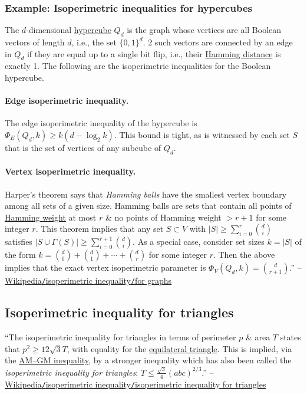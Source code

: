 \documentclass[oneside]{book}
\numberwithin{equation}{section}
\begin{document}
\subsubsection{Example: Isoperimetric inequalities for hypercubes}
The $d$-dimensional \href{https://en.wikipedia.org/wiki/Hypercube}{hypercube} $Q_d$ is the graph whose vertices are all Boolean vectors of length $d$, i.e., the set $\{0,1\}^d$. 2 such vectors are connected by an edge in $Q_d$ if they are equal up to a single bit flip, i.e., their \href{https://en.wikipedia.org/wiki/Hamming_distance}{Hamming distance} is exactly 1. The following are the isoperimetric inequalities for the Boolean hypercube.

\paragraph{Edge isoperimetric inequality.} The edge isoperimetric inequality of the hypercube is $\Phi_E(Q_d,k)\ge k(d - \log_2k)$. This bound is tight, as is witnessed by each set $S$ that is the set of vertices of any subcube of $Q_d$.

\paragraph{Vertex isoperimetric inequality.} Harper's theorem says that \textit{Hamming balls} have the smallest vertex boundary among all sets of a given size. Hamming balls are sets that contain all points of \href{https://en.wikipedia.org/wiki/Hamming_weight}{Hamming weight} at most $r$ \& no points of Hamming weight $> r + 1$ for some integer $r$. This theorem implies that any set $S\subset V$ with $|S|\ge\sum_{i=0}^{r} \binom{d}{i}$ satisfies $|S\cup\Gamma(S)|\ge\sum_{i=0}^{r+1} \binom{d}{i}$. As a special case, consider set sizes $k = |S|$ of the form $k = \binom{d}{0} + \binom{d}{1} + \cdots + \binom{d}{r}$ for some integer $r$. Then the above implies that the exact vertex isoperimetric parameter is $\Phi_V(Q_d,k) = \binom{d}{r + 1}$.'' -- \href{https://en.wikipedia.org/wiki/Isoperimetric_inequality#For_graphs}{Wikipedia\texttt{/}isoperimetric inequality\texttt{/}for graphs}

\subsection{Isoperimetric inequality for triangles}
``The isoperimetric inequality for triangles in terms of perimeter $p$ \& area $T$ states that $p^2\ge 12\sqrt{3}T$, with equality for the \href{https://en.wikipedia.org/wiki/Equilateral_triangle}{equilateral triangle}. This is implied, via the \href{https://en.wikipedia.org/wiki/Inequality_of_arithmetic_and_geometric_means}{AM--GM inequality}, by a stronger inequality which has also been called the \textit{isoperimetric inequality for triangles}: $T\le\frac{\sqrt{3}}{4}(abc)^{2/3}$.'' -- \href{https://en.wikipedia.org/wiki/Isoperimetric_inequality#Isoperimetric_inequality_for_triangles}{Wikipedia\texttt{/}isoperimetric inequality\texttt{/}isoperimetric inequality for triangles}
\end{document}
